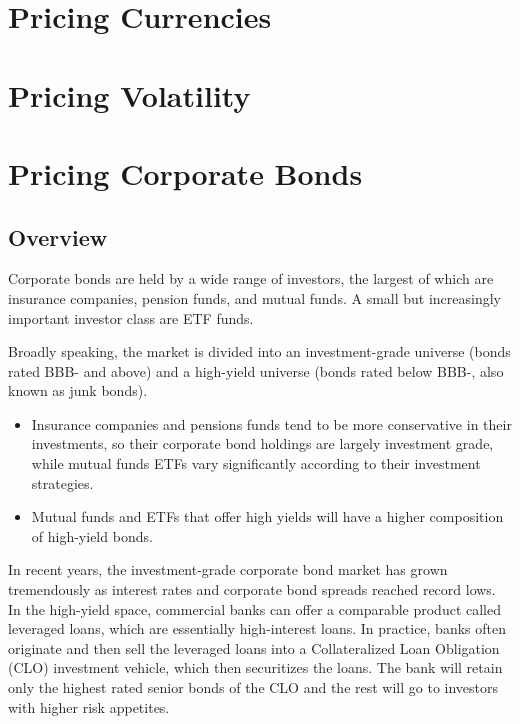 \documentclass[
]{book}
\providecommand{\tightlist}{%
  \setlength{\itemsep}{0pt}\setlength{\parskip}{0pt}}
\begin{document}
\hypertarget{pricing-currencies}{%
\chapter{Pricing Currencies}\label{pricing-currencies}}

\hypertarget{pricing-volatility}{%
\chapter{Pricing Volatility}\label{pricing-volatility}}

\hypertarget{pricing-corporate-bonds}{%
\chapter{Pricing Corporate Bonds}\label{pricing-corporate-bonds}}

\hypertarget{overview}{%
\section{Overview}\label{overview}}

Corporate bonds are held by a wide range of investors, the largest of which are insurance companies, pension funds, and mutual funds. A small but increasingly important investor class are ETF funds.

Broadly speaking, the market is divided into an investment-grade universe (bonds rated BBB- and above) and a high-yield universe (bonds rated below BBB-, also known as junk bonds).

\begin{itemize}
\tightlist
\item
  Insurance companies and pensions funds tend to be more conservative in their investments, so their corporate bond holdings are largely investment grade, while mutual funds ETFs vary significantly according to their investment strategies.
\item
  Mutual funds and ETFs that offer high yields will have a higher composition of high-yield bonds.
\end{itemize}

In recent years, the investment-grade corporate bond market has grown tremendously as interest rates and corporate bond spreads reached record lows. In the high-yield space, commercial banks can offer a comparable product called leveraged loans, which are essentially high-interest loans. In practice, banks often originate and then sell the leveraged loans into a Collateralized Loan Obligation (CLO) investment vehicle, which then securitizes the loans. The bank will retain only the highest rated senior bonds of the CLO and the rest will go to investors with higher risk appetites.
\end{document}
